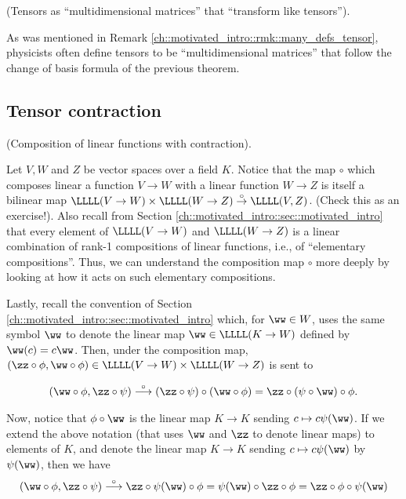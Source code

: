 \begin{remark}
    (Tensors as ``multidimensional matrices'' that ``transform like tensors''). 
    
    As was mentioned in Remark \ref{ch::motivated_intro::rmk::many_defs_tensor}, physicists often define tensors to be ``multidimensional matrices'' that follow the change of basis formula of the previous theorem.
\end{remark}

\newpage

\subsection*{Tensor contraction}

\begin{deriv}
\label{ch::intro_to_tensors::deriv::compos_linear_map_with_contract}
    (Composition of linear functions with contraction). 
    
    Let $V, W$ and $Z$ be vector spaces over a field $K$. Notice that the map $\circ$ which composes linear a function $V \rightarrow W$ with a linear function $W \rightarrow Z$ is itself a bilinear map $\LLLL(V \rightarrow W) \times \LLLL(W \rightarrow Z) \overset{\circ}{\rightarrow} \LLLL(V, Z)$. (Check this as an exercise!). Also recall from Section \ref{ch::motivated_intro::sec::motivated_intro} that every element of $\LLLL(V \rightarrow W)$ and $\LLLL(W \rightarrow Z)$ is a linear combination of rank-1 compositions of linear functions, i.e., of ``elementary compositions''. Thus, we can understand the composition map $\circ$ more deeply by looking at how it acts on such elementary compositions. 
    
    Lastly, recall the convention of Section \ref{ch::motivated_intro::sec::motivated_intro} which, for $\ww \in W$, uses the same symbol $\ww$ to denote the linear map $\ww \in \LLLL(K \rightarrow W)$ defined by $\ww(c) = c\ww$. Then, under the composition map, ${(\zz \circ \phi, \ww \circ \phi) \in \LLLL(V \rightarrow W) \times \LLLL(W \rightarrow Z)}$ is sent to
    
    \begin{align*}
        (\ww \circ \phi, \zz \circ \psi) \overset{\circ}{\longrightarrow} (\zz \circ \psi) \circ (\ww \circ \phi) = \zz \circ (\psi \circ \ww) \circ \phi.
    \end{align*}
    
    Now, notice that $\phi \circ \ww$ is the linear map $K \rightarrow K$ sending $c \mapsto c\psi(\ww)$. If we extend the above notation (that uses $\ww$ and $\zz$ to denote linear maps) to elements of $K$, and denote the linear map $K \rightarrow K$ sending $c \mapsto c\psi(\ww)$ by $\psi(\ww)$, then we have 
    \begin{align*}
        (\ww \circ \phi, \zz \circ \psi) \overset{\circ}{\longrightarrow} \zz \circ \psi(\ww) \circ \phi = \psi(\ww) \circ \zz \circ \phi = \zz \circ \phi \circ \psi(\ww)
    \end{align*}
    

\end{deriv}

